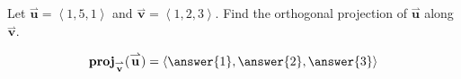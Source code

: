 \documentclass{ximera}
\author{Gregory Hartman \and Matthew Carr}
\begin{document}
\begin{exercise}
Let $\overset{\boldsymbol{\rightharpoonup}}{\mathbf{u}} =\left< 1,5,1 \right>$ and $\overset{\boldsymbol{\rightharpoonup}}{\mathbf{v}} = \left< 1,2,3 \right>$. Find the
orthogonal projection of $\overset{\boldsymbol{\rightharpoonup}}{\mathbf{u}}$ along $\overset{\boldsymbol{\rightharpoonup}}{\mathbf{v}}$.
\begin{prompt}
\[
\mathbf{proj}_{\overset{\boldsymbol{\rightharpoonup}}{\mathbf{v}}}(\overset{\boldsymbol{\rightharpoonup}}{\mathbf{u}})= \left< \answer{1},\answer{2},\answer{3} \right>
\]
\end{prompt}

\end{exercise}
\end{document}
